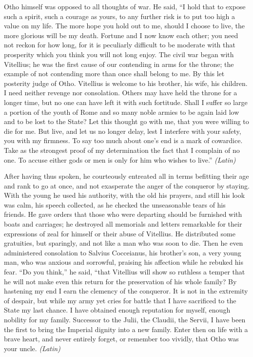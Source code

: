 
Otho himself was opposed to all thoughts of war. He said, ``I hold that to expose such a spirit, such a courage as yours, to any further risk is to put too high a value on my life. The more hope you hold out to me, should I choose to live, the more glorious will be my death. Fortune and I now know each other; you need not reckon for how long, for it is peculiarly difficult to be moderate with that prosperity which you think you will not long enjoy. The civil war began with Vitellius; he was the first cause of our contending in arms for the throne; the example of not contending more than once shall belong to me. By this let posterity judge of Otho. Vitellius is welcome to his brother, his wife, his children. I need neither revenge nor consolation. Others may have held the throne for a longer time, but no one can have left it with such fortitude. Shall I suffer so large a portion of the youth of Rome and so many noble armies to be again laid low and to be lost to the State? Let this thought go with me, that you were willing to die for me. But live, and let us no longer delay, lest I interfere with your safety, you with my firmness. To say too much about one's end is a mark of cowardice. Take as the strongest proof of my determination the fact that I complain of no one. To accuse either gods or men is only for him who wishes to live.'' \emph{(Latin)}


After having thus spoken, he courteously entreated all in terms befitting their age and rank to go at once, and not exasperate the anger of the conqueror by staying. With the young he used his authority, with the old his prayers, and still his look was calm, his speech collected, as he checked the unseasonable tears of his friends. He gave orders that those who were departing should be furnished with boats and carriages; he destroyed all memorials and letters remarkable for their expressions of zeal for himself or their abuse of Vitellius. He distributed some gratuities, but sparingly, and not like a man who was soon to die. Then he even administered consolation to Salvius Cocceianus, his brother's son, a very young man, who was anxious and sorrowful, praising his affection while he rebuked his fear. ``Do you think,'' he said, ``that Vitellius will show so ruthless a temper that he will not make even this return for the preservation of his whole family? By hastening my end I earn the clemency of the conqueror. It is not in the extremity of despair, but while my army yet cries for battle that I have sacrificed to the State my last chance. I have obtained enough reputation for myself, enough nobility for my family. Successor to the Julii, the Claudii, the Servii, I have been the first to bring the Imperial dignity into a new family. Enter then on life with a brave heart, and never entirely forget, or remember too vividly, that Otho was your uncle. \emph{(Latin)}

